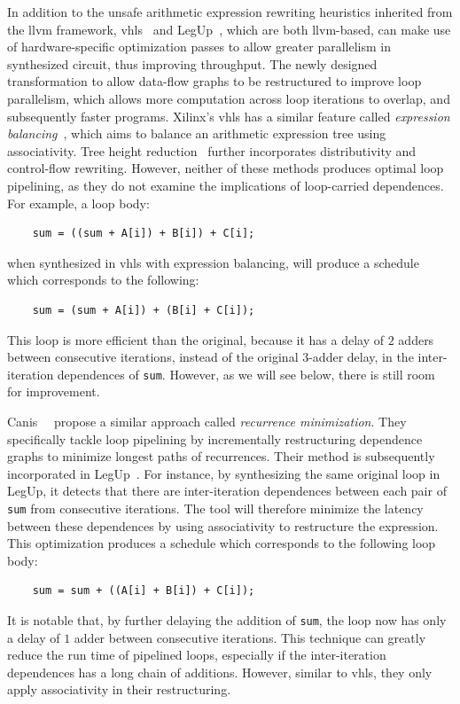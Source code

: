 In addition to the unsafe arithmetic expression rewriting heuristics
inherited from the \gls{llvm} framework, \gls{vhls}~\cite{vivado_hls}
and LegUp~\cite{legup}, which are both \gls{llvm}-based, can make use
of hardware-specific optimization passes to allow greater parallelism
in synthesized circuit, thus improving throughput.  The newly designed
transformation to allow data-flow graphs to be restructured to improve
loop parallelism, which allows more computation across loop iterations to
overlap, and subsequently faster programs.  Xilinx's \gls{vhls} has a similar
feature called \emph{expression balancing}~\cite{vivado_hls}, which aims
to balance an arithmetic expression tree using associativity.  Tree height
reduction~\cite{nicolau91} further incorporates distributivity and control-flow
rewriting.  However, neither of these methods produces optimal loop pipelining,
as they do not examine the implications of loop-carried dependences.  For
example, a loop body:
\begin{lstlisting}
    sum = ((sum + A[i]) + B[i]) + C[i];
\end{lstlisting}\vspace{-15pt}
when synthesized in \gls{vhls} with expression balancing, will produce a
schedule which corresponds to the following:
\begin{lstlisting}
    sum = (sum + A[i]) + (B[i] + C[i]);
\end{lstlisting}\vspace{-15pt}
This loop is more efficient than the original, because it has a delay of $2$
adders between consecutive iterations, instead of the original $3$-adder delay,
in the inter-iteration dependences of \verb|sum|.  However, as we will see
below, there is still room for improvement.

Canis~\etal~\cite{canis14} propose a similar approach called \emph{recurrence
minimization}.  They specifically tackle loop pipelining by incrementally
restructuring dependence graphs to minimize longest paths of recurrences.
Their method is subsequently incorporated in LegUp~\cite{legup}.  For instance,
by synthesizing the same original loop in LegUp, it detects that there are
inter-iteration dependences between each pair of \verb|sum| from consecutive
iterations.  The tool will therefore minimize the latency between these
dependences by using associativity to restructure the expression.  This
optimization produces a schedule which corresponds to the following loop body:
\begin{lstlisting}
    sum = sum + ((A[i] + B[i]) + C[i]);
\end{lstlisting}\vspace{-15pt}
It is notable that, by further delaying the addition of \verb|sum|, the loop
now has only a delay of $1$ adder between consecutive iterations.  This
technique can greatly reduce the run time of pipelined loops, especially if the
inter-iteration dependences has a long chain of additions.  However, similar to
\gls{vhls}, they only apply associativity in their restructuring.

